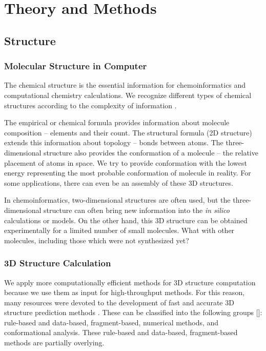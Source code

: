 \part{Theory and Methods}
\label{part:theory}

\chapter{Structure}

\section{Molecular Structure in Computer}

The chemical structure is the essential information for chemoinformatics and
computational chemistry calculations. We recognize different types of chemical
structures according to the complexity of information \cite{Gasteiger2006}. 

The empirical or chemical formula provides information about molecule
composition -- elements and their count. The structural formula (2D structure)
extends this information about topology -- bonds between atoms. The
three-dimensional structure also provides the conformation of a molecule -- the
relative placement of atoms in space. We try to provide conformation with the
lowest energy representing the most probable conformation of molecule
in reality. For some applications, there can even be an assembly of
these 3D structures.

In chemoinformatics, two-dimensional structures are often used, but the
three-dimensional structure can often bring new information into the
\textit{in silico} calculations or models. On the other hand, this 3D structure
can be obtained experimentally for a limited number of small molecules. What
with other molecules, including those which were not synthesized yet?

\section{3D Structure Calculation}

We apply more computationally efficient methods for 3D structure computation
because we use them as input for high-throughput methods. For this reason, many
resources were devoted to the development of fast and accurate 3D structure
prediction methods \cite{Sadowski2003}. These can be classified into the following
groups []: rule-based and data-based, fragment-based, numerical methods, and
conformational analysis. These rule-based and data-based, fragment-based
methods are partially overlying.

